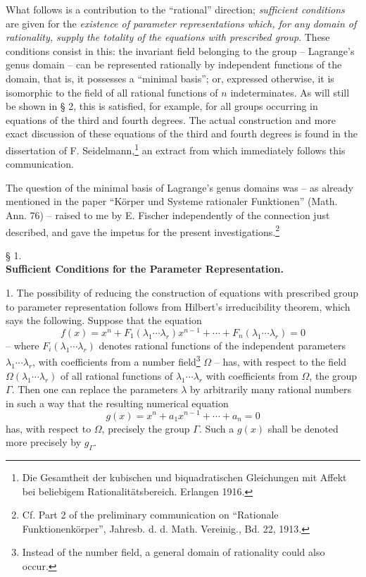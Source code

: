 \documentclass[11pt]{article}
\begin{document}
What follows is a contribution to the ``rational'' direction; \emph{sufficient conditions} are given for the \emph{existence of parameter representations which, for any domain of rationality, supply the totality of the equations with prescribed group}. These conditions consist in this: the invariant field belonging to the group -- Lagrange's genus domain -- can be represented rationally by independent functions of the domain, that is, it possesses a ``minimal basis''; or, expressed otherwise, it is isomorphic to the field of all rational functions of $n$ indeterminates. As will still be shown in § 2, this is satisfied, for example, for all groups occurring in equations of the third and fourth degrees. The actual construction and more exact discussion of these equations of the third and fourth degrees is found in the dissertation of F. Seidelmann,\footnote{Die Gesamtheit der kubischen und biquadratischen Gleichungen mit Affekt bei beliebigem Rationalitätsbereich. Erlangen 1916.} an extract from which immediately follows this communication.

The question of the minimal basis of Lagrange's genus domains was -- as already mentioned in the paper ``Körper und Systeme rationaler Funktionen'' (Math. Ann. 76) -- raised to me by E. Fischer independently of the connection just described, and gave the impetus for the present investigations.\footnote{Cf. Part 2 of the preliminary communication on ``Rationale Funktionenkörper'', Jahresb. d. d. Math. Vereinig., Bd. 22, 1913.}

\begin{center}
§ 1.\\[0.75em]
\textbf{Sufficient Conditions for the Parameter Representation.}
\end{center}

1. The possibility of reducing the construction of equations with prescribed group to parameter representation follows from Hilbert's irreducibility theorem, which says the following. Suppose that the equation
\begin{equation}
 f(x)=x^n+F_1(\lambda_1\cdots\lambda_r)x^{n-1}+\cdots+F_n(\lambda_1\cdots\lambda_r)=0
\tag{1}
\end{equation}
-- where $F_i(\lambda_1\cdots\lambda_r)$ denotes rational functions of the independent parameters $\lambda_1\cdots\lambda_r$, with coefficients from a number field\footnote{Instead of the number field, a general domain of rationality could also occur.} $\Omega$ -- has, with respect to the field $\Omega(\lambda_1\cdots\lambda_r)$ of all rational functions of $\lambda_1\cdots\lambda_r$ with coefficients from $\Omega$, the group $\Gamma$. Then one can replace the parameters $\lambda$ by arbitrarily many rational numbers in such a way that the resulting numerical equation
\begin{equation}
 g(x)=x^n+a_1x^{n-1}+\cdots+a_n=0
\tag{2}
\end{equation}
has, with respect to $\Omega$, precisely the group $\Gamma$. Such a $g(x)$ shall be denoted more precisely by $g_\Gamma$.
\end{document}
